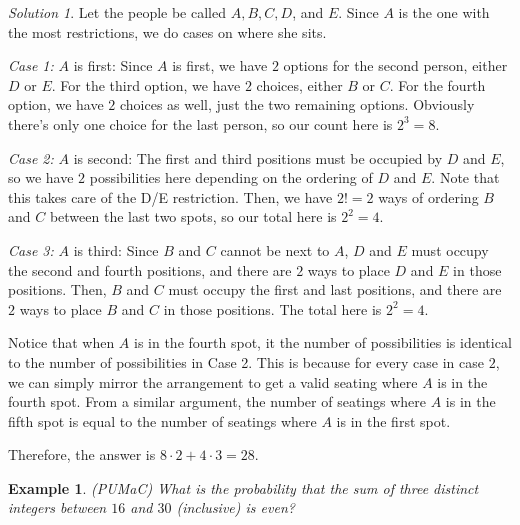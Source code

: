 \documentclass[letterpaper]{article}
\newtheorem{example}[thm]{Example}
\theoremstyle{remark}
\newtheorem*{solution}{Solution}
\theoremstyle{definition}
\begin{document}
\begin{solution}
Let the people be called $A, B, C, D$, and $E$. Since $A$ is the one with the most restrictions, we do cases on where she sits. 
\newline

\textit{Case 1:} $A$ is first: Since $A$ is first, we have $2$ options for the second person, either $D$ or $E$. For the third option, we have $2$ choices, either $B$ or $C$. For the fourth option, we have $2$ choices as well, just the two remaining options. Obviously there's only one choice for the last person, so our count here is $2^3=8$.
\newline

\textit{Case 2:} $A$ is second: The first and third positions must be occupied by $D$ and $E$, so we have $2$ possibilities here depending on the ordering of $D$ and $E$. Note that this takes care of the D/E restriction. Then, we have $2!=2$ ways of ordering $B$ and $C$ between the last two spots, so our total here is $2^2=4$.
\newline

\textit{Case 3:} $A$ is third: Since $B$ and $C$ cannot be next to $A$, $D$ and $E$ must occupy the second and fourth positions, and there are $2$ ways to place $D$ and $E$ in those positions. Then, $B$ and $C$ must occupy the first and last positions, and there are $2$ ways to place $B$ and $C$ in those positions. The total here is $2^2=4$.
\newline

Notice that when $A$ is in the fourth spot, it the number of possibilities is identical to the number of possibilities in Case 2. This is because for every case in case $2$, we can simply mirror the arrangement to get a valid seating where $A$ is in the fourth spot. From a similar argument, the number of seatings where $A$ is in the fifth spot is equal to the number of seatings where $A$ is in the first spot.


Therefore, the answer is $8\cdot 2+4\cdot 3=28$.
\end{solution}

\bigskip

\begin{example}
(PUMaC) What is the probability that the sum of three distinct integers between $16$ and $30$ (inclusive) is even?
\end{example}
\end{document}
